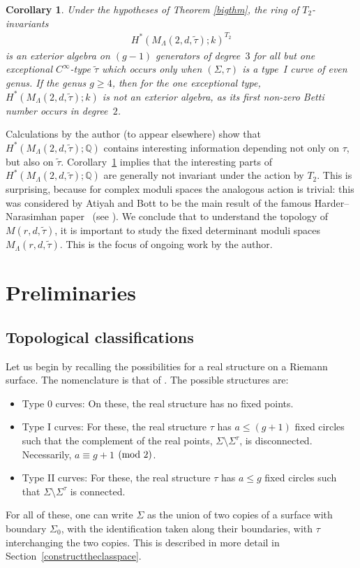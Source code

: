 \documentclass[10pt,a4paper]{amsart}
\numberwithin{equation}{section}
\newtheorem{Corollary}[Theorem]{Corollary}
{\theoremstyle{definition}
\newtheorem{Remark}[Theorem]{Remark}}
\begin{document}
\begin{Corollary}\label{BigCor}
Under the hypotheses of Theorem {\rm \ref{bigthm}}, the ring of $T_2$-invariants \begin{gather*} H^*(M_{\Lambda}(2,d,\tilde{\tau}); k)^{T_2}\end{gather*} is an exterior algebra on $(g-1)$ generators of degree~$3$ for all but one exceptional $C^{\infty}$-type $\tilde{\tau}$ which occurs only when $(\Sigma,\tau)$ is a type~I curve of even genus. If the genus $g \geq 4$, then for the one exceptional type, $H^*(M_{\Lambda}(2,d,\tilde{\tau}); k)$ is not an exterior algebra, as its first non-zero Betti number occurs in degree~$2$.	
\end{Corollary}

Calculations by the author (to appear elsewhere) show that $H^*(M_{\Lambda}(2,d, \tilde{\tau}); {\mathbb Q})$ contains interesting information depending not only on $\tau$, but also on $\tilde{\tau}$. Corollary~\ref{BigCor} implies that the interesting parts of $H^*(M_{\Lambda}(2,d,\tilde{\tau}); {\mathbb Q})$ are generally not invariant under the action by $T_2$. This is surprising, because for complex moduli spaces the analogous action is trivial: this was considered by Atiyah and Bott to be the main result of the famous Harder--Narasimhan paper~\cite{HN} (see \cite[Section~9]{AB}). We conclude that to understand the topology of $M(r,d,\tilde{\tau})$, it is important to study the f\/ixed determinant moduli spaces $M_{\Lambda}(r,d,\tilde{\tau})$. This is the focus of ongoing work by the author.

\section{Preliminaries}

\subsection{Topological classif\/ications}\label{Review}

Let us begin by recalling the possibilities for a real structure on a Riemann surface. The nomenclature is that of \cite{BHH}. The possible structures are:
\begin{itemize}\itemsep=0pt
\item {Type 0 curves}: On these, the real structure has no f\/ixed points.
\item{Type I curves}: For these, the real structure $\tau$ has $a\leq (g+1)$ f\/ixed circles such that the complement of the real points, $\Sigma \setminus \Sigma^{\tau}$, is disconnected. Necessarily, $a \equiv g+1$ $({\rm mod}~2)$.
\item{Type II curves}: For these, the real structure $\tau$ has $a \leq g$ f\/ixed circles such that $\Sigma \setminus \Sigma^{\tau}$ is connected.
\end{itemize}
For all of these, one can write $\Sigma$ as the union of two copies of a surface with boundary $\Sigma_0$, with the identif\/ication taken along their boundaries, with $\tau$ interchanging the two copies. This is described in more detail in Section~\ref{constructtheclasspace}.
\end{document}
